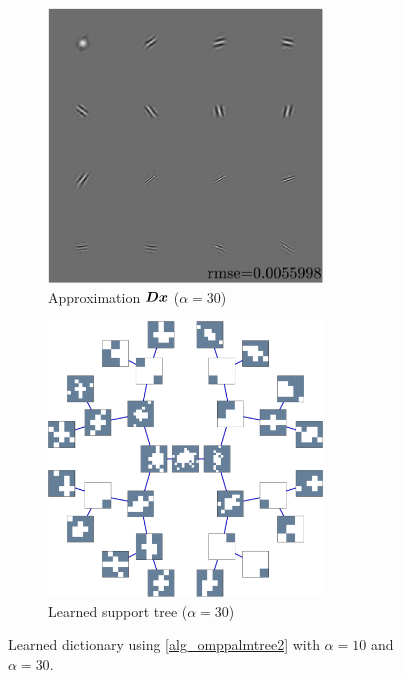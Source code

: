 \begin{figure}[!h] \ContinuedFloat
\begin{subfigure}[b]{0.49\textwidth}\centering
\includegraphics[width=0.8\textwidth]{figures/tree-unbalanced-supp/xp_learnsupp256_curvelet_decomp3[tree-binary_dpth4]_supp-diracs_[usegrad1_every5_add5_totinit0_totadd279_alpha30]_approx.pdf}
\caption{Approximation $\bm{D}\bm{x}$ ($\alpha=30$)}
\end{subfigure}
\begin{subfigure}[b]{0.49\textwidth}\centering
\includegraphics[width=0.8\textwidth]{figures/tree-unbalanced-supp/xp_learnsupp256_curvelet_decomp3[tree-binary_dpth4]_supp-diracs_[usegrad1_every5_add5_totinit0_totadd279_alpha30]_tree.pdf}
\caption{Learned support tree ($\alpha=30$)}
\end{subfigure}
\caption{Learned dictionary using \cref{alg_omppalmtree2} with $\alpha=10$ and $\alpha=30$.}\label{fig_test_omppalmtree2}
\end{figure}

